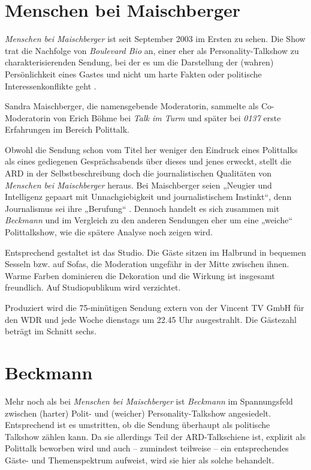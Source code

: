 \section{Menschen bei Maischberger}

\textit{Menschen bei Maischberger} ist seit September 2003 im Ersten zu sehen. Die Show trat die Nachfolge von \textit{Boulevard Bio} an, einer eher als Personality-Talkshow zu charakterisierenden Sendung, bei der es um die Darstellung der (wahren) Persönlichkeit eines Gastes und nicht um harte Fakten oder politische Interessenkonflikte geht \parencite{gehringerBoulevardBioNur2001}.

Sandra Maischberger, die namensgebende Moderatorin, sammelte als Co-Moderatorin von Erich Böhme bei \textit{Talk im Turm} und später bei \textit{0137} erste Erfahrungen im Bereich Polittalk.

Obwohl die Sendung schon vom Titel her weniger den Eindruck eines Polittalks als eines gediegenen Gesprächsabends über dieses und jenes erweckt, stellt die ARD in der Selbstbeschreibung doch die journalistischen Qualitäten von \textit{Menschen bei Maischberger} heraus. Bei Maischberger seien „Neugier und Intelligenz gepaart mit Unnachgiebigkeit und journalistischem Instinkt“, denn Journalismus sei ihre „Berufung“ \parencite{ardSandraMaischbergero.J.}. Dennoch handelt es sich zusammen mit \textit{Beckmann} und im Vergleich zu den anderen Sendungen eher um eine „weiche“ Polittalkshow, wie die spätere Analyse noch zeigen wird.

Entsprechend gestaltet ist das Studio. Die Gäste sitzen im Halbrund in bequemen Sesseln bzw. auf Sofas, die Moderation ungefähr in der Mitte zwischen ihnen. Warme Farben dominieren die Dekoration und die Wirkung ist insgesamt freundlich. Auf Studiopublikum wird verzichtet.

Produziert wird die 75-minütigen Sendung extern von der Vincent TV GmbH für den WDR und jede Woche dienstags um 22.45 Uhr ausgestrahlt. Die Gästezahl beträgt im Schnitt sechs.

\section{Beckmann}

Mehr noch als bei \textit{Menschen bei Maischberger} ist \textit{Beckmann} im Spannungsfeld zwischen (harter) Polit- und (weicher) Personality-Talkshow angesiedelt. Entsprechend ist es umstritten, ob die Sendung überhaupt als politische Talkshow zählen kann. Da sie allerdings Teil der ARD-Talkschiene ist, explizit als Polittalk beworben wird und auch – zumindest teilweise – ein entsprechendes Gäste- und Themenspektrum aufweist, wird sie hier als solche behandelt.

